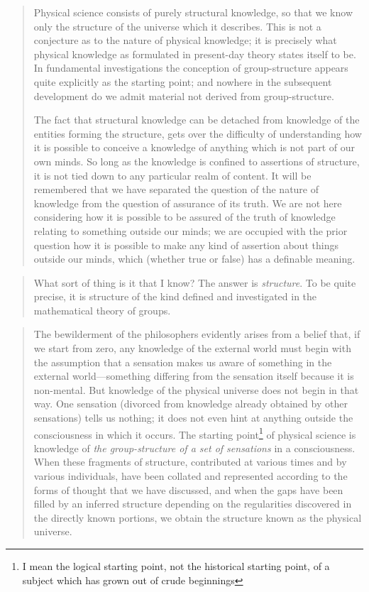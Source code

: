 \begin{quote}
    Physical science consists of purely structural knowledge, so that we know only the structure of the universe which it describes.  This is not a conjecture as to the nature of physical knowledge; it is precisely what physical knowledge as formulated in present-day theory states itself to be.  In fundamental investigations the conception of group-structure appears quite explicitly as the starting point; and nowhere in the subsequent development do we admit material not derived from group-structure.
    
    The fact that structural knowledge can be detached from knowledge of the entities forming the structure, gets over the difficulty of understanding how it is possible to conceive a knowledge of anything which is not part of our own minds.  So long as the knowledge is confined to assertions of structure, it is not tied down to any particular realm of content.  It will be remembered that we have separated the question of the nature of knowledge from the question of assurance of its truth.  We are not here considering how it is possible to be assured of the truth of knowledge relating to something outside our minds; we are occupied with the prior question how it is possible to make any kind of assertion about things outside our minds, which (whether true or false) has a definable meaning.
    
    \citep[p. 141-143]{Eddington1939}
\end{quote}

\begin{quote}
    What sort of thing is it that I know?  The answer is \emph{structure}.  To be quite precise, it is structure of the kind defined and investigated in the mathematical theory of groups.
    
    \citep[p. 147]{Eddington1939}
\end{quote}

\begin{quote}
    The bewilderment of the philosophers evidently arises from a belief that, if we start from zero, any knowledge of the external world must begin with the assumption that a sensation makes us aware of something in the external world---something differing from the sensation itself because it is non-mental.  But knowledge of the physical universe does not begin in that way.  One sensation (divorced from knowledge already obtained by other sensations) tells us nothing; it does not even hint at anything outside the consciousness in which it occurs.  The starting point\footnote{I mean the logical starting point, not the historical starting point, of a subject which has grown out of crude beginnings} of physical science is knowledge of \emph{the group-structure of a set of sensations} in a consciousness.  When these fragments of structure, contributed at various times and by various individuals, have been collated and represented according to the forms of thought that we have discussed, and when the gaps have been filled by an inferred structure depending on the regularities discovered in the directly known portions, we obtain the structure known as the physical universe.
    
    \citep[p. 147-148]{Eddington1939}
\end{quote}


